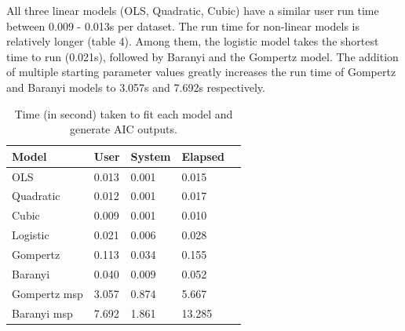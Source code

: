 \documentclass[11pt]{article}
\begin{document}
All three linear models (OLS, Quadratic, Cubic) have a similar user run time between 0.009 - 0.013s per dataset. The run time for non-linear models is relatively longer (table 4). Among them, the logistic model takes the shortest time to run (0.021s), followed by Baranyi and the Gompertz model. The addition of multiple starting parameter values greatly increases the run time of Gompertz and Baranyi models to 3.057s and 7.692s respectively. 

\vspace{\baselineskip}

\begin{table}[]
\caption{Time (in second) taken to fit each model and generate AIC outputs.}
\begin{tabular}{@{}lllll@{}}
\toprule
Model        & User  & System & Elapsed &  \\ \midrule
OLS          & 0.013 & 0.001  & 0.015   &  \\
Quadratic    & 0.012 & 0.001  & 0.017   &  \\
Cubic        & 0.009 & 0.001  & 0.010   &  \\
Logistic     & 0.021 & 0.006  & 0.028   &  \\
Gompertz     & 0.113 & 0.034  & 0.155   &  \\
Baranyi      & 0.040 & 0.009  & 0.052   &  \\
Gompertz msp & 3.057 & 0.874  & 5.667   &  \\
Baranyi msp  & 7.692 & 1.861  & 13.285  & 
\end{tabular}
\end{table}
\end{document}
